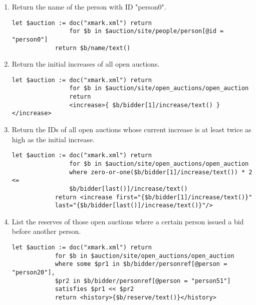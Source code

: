 \label{xmark-queries}
	\begin{enumerate}[label=Q\arabic*.]
		\paragraph{exact Match}
		\item %
			Return the name of the person with ID "person0". \\
		\begin{lstlisting}[style=XQuery]
			let $auction := doc("xmark.xml") return
				for $b in $auction/site/people/person[@id = "person0"]
			return $b/name/text()
		\end{lstlisting}
		\item %
			Return the initial increases of all open auctions. \\
		\begin{lstlisting}[style=XQuery]
			let $auction := doc("xmark.xml") return
    			for $b in $auction/site/open_auctions/open_auction
    			return
                <increase>{ $b/bidder[1]/increase/text() }</increase>
		\end{lstlisting}
		\item %
			Return the IDs of all open auctions whose current increase is at least twice as high as the initial increase. \\
		\begin{lstlisting}[style=XQuery]
			let $auction := doc("xmark.xml") return
				for $b in $auction/site/open_auctions/open_auction
				where zero-or-one($b/bidder[1]/increase/text()) * 2 <=
				$b/bidder[last()]/increase/text()
			return <increase first="{$b/bidder[1]/increase/text()}"
			last="{$b/bidder[last()]/increase/text()}"/>
		\end{lstlisting}	
		
		\item %
			List the reserves of those open auctions where a certain person issued a bid before another person.
		\begin{lstlisting}[style=XQuery]
			let $auction := doc("xmark.xml") return
			for $b in $auction/site/open_auctions/open_auction
			where some $pr1 in $b/bidder/personref[@person = "person20"],
			$pr2 in $b/bidder/personref[@person = "person51"]
			satisfies $pr1 << $pr2
			return <history>{$b/reserve/text()}</history>
		\end{lstlisting}	
		

\end{enumerate}
